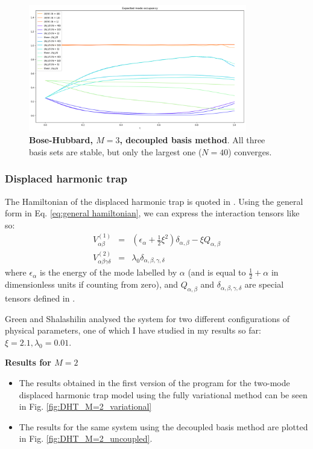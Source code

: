 \documentclass[12pt]{article}
\begin{document}
	\begin{figure}
	\begin{center}
	\includegraphics[width=0.85\textwidth]{images/BH_M=3_uncoupled_basis}
	\caption{\textbf{Bose-Hubbard, $M=3$, decoupled basis method}. All three basis sets are stable, but only the largest one ($N=40$) converges.}\label{fig:BH_M=3_uncoupled}
	\end{center}
	\end{figure}
	
	
	\subsubsection{Displaced harmonic trap}
	The Hamiltonian of the displaced harmonic trap is quoted in \cite[Eq. 34]{green}. Using the general form in Eq. \ref{eq:general hamiltonian}, we can express the interaction tensors like so:
	\begin{eqnarray}
	V^{(1)}_{\alpha\beta}&=&\left(\epsilon_{\alpha}+\frac{1}{2}\xi^2\right)\delta_{\alpha,\beta}-\xi Q_{\alpha,\beta}\\
	V^{(2)}_{\alpha\beta\gamma\delta}&=&\lambda_0\delta_{\alpha,\beta,\gamma,\delta}
	\end{eqnarray}
	where $\epsilon_{\alpha}$ is the energy of the mode labelled by $\alpha$ (and is equal to $\frac{1}{2}+\alpha$ in dimensionless units if counting from zero), and $Q_{\alpha,\beta}$ and $\delta_{\alpha,\beta,\gamma,\delta}$ are special tensors defined in \cite[Appendix B]{green}.
	
	Green and Shalashilin analysed the system for two different configurations of physical parameters, one of which I have studied in my results so far: $\xi=2.1,\lambda_0=0.01$.
	
	\textbf{Results for $M=2$}
	\begin{itemize}
	\item The results obtained in the first version of the program for the two-mode displaced harmonic trap model using the fully variational method can be seen in Fig. \ref{fig:DHT_M=2_variational}
	\item The results for the same system using the decoupled basis method are plotted in Fig. \ref{fig:DHT_M=2_uncoupled}.
	\end{itemize}
	
\end{document}
